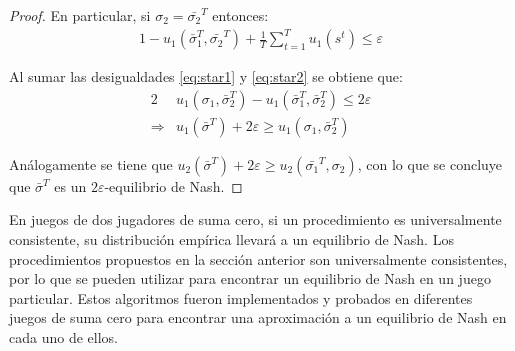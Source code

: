 \begin{proof}
En particular, si $\sigma_2 = \bar{\sigma_2}^T$ entonces:
\begin{alignat}{1}
\label{eq:star2}
-u_1(\bar{\sigma}_1^T, \bar{\sigma_2}^T) + \frac{1}{T} \sum_{t=1}^T u_1(s^t) \leq \varepsilon
\end{alignat}

Al sumar las desigualdades \ref{eq:star1} y \ref{eq:star2} se obtiene que:
\begin{alignat}{2}
& u_1(\sigma_1, \bar{\sigma}_2^T) - u_1(\bar{\sigma}_1^T, \bar{\sigma}_2^T) \leq 2\varepsilon \\
\Rightarrow & u_1(\bar{\sigma}^T) + 2\varepsilon \geq u_1(\sigma_1, \bar{\sigma}_2^T)
\end{alignat}

Análogamente se tiene que $u_2(\bar{\sigma}^T) + 2\varepsilon \geq u_2(\bar{\sigma_1}^T, \sigma_2)$, con lo que se concluye que $\bar{\sigma}^T$ es un $2\varepsilon$-equilibrio de Nash.
\end{proof}

En juegos de dos jugadores de suma cero, si un procedimiento es universalmente consistente, su distribución empírica llevará a un equilibrio de Nash. Los procedimientos propuestos en la sección anterior son universalmente consistentes, por lo que se pueden utilizar para encontrar un equilibrio de Nash en un juego particular. Estos algoritmos fueron implementados y probados en diferentes juegos de suma cero para encontrar una aproximación a un equilibrio de Nash en cada uno de ellos.